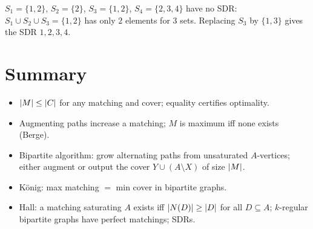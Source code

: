 \begin{example}
$S_1 = \{1,2\}$, $S_2 = \{2\}$, $S_3 = \{1,2\}$, $S_4 = \{2,3,4\}$ have no SDR: $S_1\cup S_2\cup S_3 =
\{1,2\}$ has only $2$ elements for $3$ sets. Replacing $S_3$ by $\{1,3\}$ gives the SDR
$1, 2, 3, 4$.
\end{example}

\section{Summary}
\begin{itemize}
  \item $\left\lvert M \right\rvert\le\left\lvert C \right\rvert$ for any matching and cover; equality certifies optimality.
  \item Augmenting paths increase a matching; $M$ is maximum iff none exists (Berge).
  \item Bipartite algorithm: grow alternating paths from unsaturated $A$-vertices; either augment
        or output the cover $Y\cup(A\setminus X)$ of size $\left\lvert M \right\rvert$.
  \item K\"onig: max matching $=$ min cover in bipartite graphs.
  \item Hall: a matching saturating $A$ exists iff $\left\lvert N(D) \right\rvert\ge\left\lvert D \right\rvert$ for all $D\subseteq A$;
        $k$-regular bipartite graphs have perfect matchings; SDRs.
\end{itemize}
